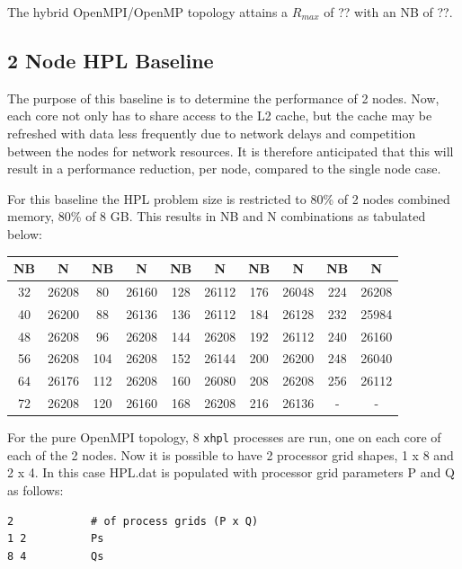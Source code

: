 \documentclass{report}
\begin{document}
The hybrid OpenMPI/OpenMP topology attains a $R_{max}$ of ?? with an NB of ??.


%
%
\subsection{2 Node HPL Baseline}

The purpose of this baseline is to determine the performance of 2 nodes. Now, each core not only has to share access to the L2 cache, but the cache may be refreshed with data less frequently due to network delays and competition between the nodes for network resources. It is therefore anticipated that this will result in a performance reduction, per node, compared to the single node case.

For this baseline the HPL problem size is restricted to 80\% of 2 nodes combined memory, 80\% of 8 GB. This results in NB and N combinations as tabulated below:

\begin{center}
	\begin{tabular}{ |c|c|c|c|c|c|c|c|c|c| } 
		\hline
		NB & N & NB & N & NB & N & NB & N & NB & N \\ 
		\hline
		32 & 26208 &  80 & 26160 & 128 & 26112 & 176 & 26048 & 224 & 26208 \\ 
		40 & 26200 &  88 & 26136 & 136 & 26112 & 184 & 26128 & 232 & 25984 \\ 
 		48 & 26208 &  96 & 26208 & 144 & 26208 & 192 & 26112 & 240 & 26160 \\
		56 & 26208 & 104 & 26208 & 152 & 26144 & 200 & 26200 & 248 & 26040 \\ 
 		64 & 26176 & 112 & 26208 & 160 & 26080 & 208 & 26208 & 256 & 26112 \\
		72 & 26208 & 120 & 26160 & 168 & 26208 & 216 & 26136 &   - &     - \\ 
 		\hline
	\end{tabular}
\end{center}

For the pure OpenMPI topology, 8 \verb|xhpl| processes are run, one on each core of each of the 2 nodes. Now it is possible to have 2 processor grid shapes, 1 x 8 and 2 x 4. In this case HPL.dat is populated with processor grid parameters P and Q as follows:

\lstset{style=listing}
\begin{lstlisting}[numbers=none]
2            # of process grids (P x Q)
1 2          Ps
8 4          Qs
\end{lstlisting}
\end{document}
